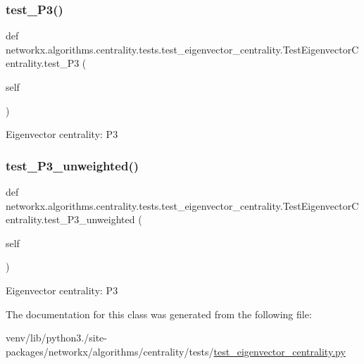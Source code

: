 \subsubsection{\texorpdfstring{test\+\_\+\+P3()}{test\_P3()}}
{\footnotesize\ttfamily def networkx.\+algorithms.\+centrality.\+tests.\+test\+\_\+eigenvector\+\_\+centrality.\+Test\+Eigenvector\+Centrality.\+test\+\_\+\+P3 (\begin{DoxyParamCaption}\item[{}]{self }\end{DoxyParamCaption})}

\begin{DoxyVerb}Eigenvector centrality: P3\end{DoxyVerb}
 \mbox{\label{classnetworkx_1_1algorithms_1_1centrality_1_1tests_1_1test__eigenvector__centrality_1_1TestEigenvectorCentrality_a480cc55e5c0415c37df0156370857bf8}} 
\subsubsection{\texorpdfstring{test\+\_\+\+P3\+\_\+unweighted()}{test\_P3\_unweighted()}}
{\footnotesize\ttfamily def networkx.\+algorithms.\+centrality.\+tests.\+test\+\_\+eigenvector\+\_\+centrality.\+Test\+Eigenvector\+Centrality.\+test\+\_\+\+P3\+\_\+unweighted (\begin{DoxyParamCaption}\item[{}]{self }\end{DoxyParamCaption})}

\begin{DoxyVerb}Eigenvector centrality: P3\end{DoxyVerb}
 

The documentation for this class was generated from the following file\+:\begin{DoxyCompactItemize}
\item 
venv/lib/python3./site-\/packages/networkx/algorithms/centrality/tests/\hyperlink{test__eigenvector__centrality_8py}{test\+\_\+eigenvector\+\_\+centrality.\+py}\end{DoxyCompactItemize}
